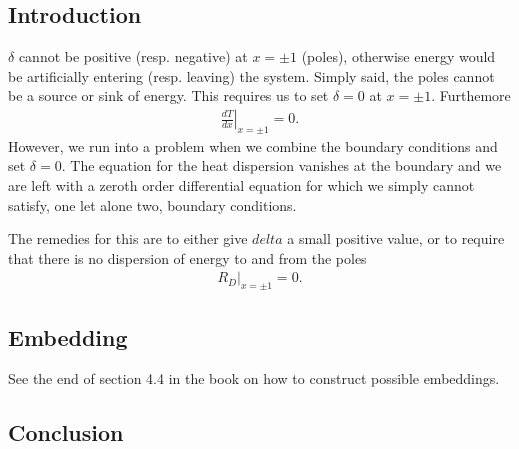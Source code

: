 \subsection{Introduction}
    $\delta$ cannot be positive (resp. negative) at $x = \pm 1$ (poles), otherwise energy would be
    artificially entering (resp. leaving) the system. Simply said, the poles cannot be a source or sink of energy.
    This requires us to set $\delta = 0$ at $x = \pm 1$. Furthemore 
    \begin{align*}
            \left.\frac{d T}{dx}\right|_{x = \pm 1} = 0.
    \label{eq:bcs}
    \end{align*}
    However, we run into a problem when we combine the boundary conditions and set $\delta = 0$. The 
    equation for the heat dispersion vanishes at the boundary and we are left with a zeroth order differential equation 
    for which we simply cannot satisfy, one let alone two, boundary conditions.

    The remedies for this are to either give $delta$ a small positive value, or to require that there is no
    dispersion of energy to and from the poles
    \begin{align*}
        \left.R_D\right|_{x = \pm 1} = 0.
    \end{align*}

\subsection{Embedding}
    See the end of section 4.4 in the book on how to construct possible embeddings.

\subsection{Conclusion}